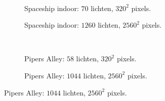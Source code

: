 \begin{figure}[t]
\begin{subfigure}[b]{\textwidth}
  \end{subfigure}\hfill\\
  \begin{adjustbox}{minipage=\textwidth, scale=0.55}
    \begin{subfigure}[b]{0.8\textwidth}
      \centering
      \def\svgwidth{\textwidth}
      
      \caption{Spaceship indoor: $70$ lichten, $320^2$ pixels.}
      \label{fig:ts-lc-frames-deferred:indoor-low}
    \end{subfigure}
  \end{adjustbox}\hspace{-0.075\textwidth}  %
  \begin{adjustbox}{minipage=\textwidth, scale=0.55}
    \begin{subfigure}[b]{0.8\textwidth}
      \centering
      \def\svgwidth{\textwidth}
      
      \caption{Spaceship indoor: $1260$ lichten, $2560^2$ pixels.}
      \label{fig:ts-lc-frames-deferred:indoor-high}
    \end{subfigure}
  \end{adjustbox} \\
  \begin{adjustbox}{minipage=\textwidth, scale=0.55}
    \begin{subfigure}[b]{0.8\textwidth}
      \centering
      \def\svgwidth{\textwidth}
      
      \caption{Pipers Alley: $58$ lichten, $320^2$ pixels.}
      \label{fig:ts-lc-frames-deferred:alley-low}
    \end{subfigure}
  \end{adjustbox}\hspace{-0.075\textwidth}  %
  \begin{adjustbox}{minipage=\textwidth, scale=0.55}
    \begin{subfigure}[b]{0.8\textwidth}
      \centering
      \def\svgwidth{\textwidth}
      
      \caption{Pipers Alley: $1044$ lichten, $2560^2$ pixels.}

\end{subfigure}
\end{adjustbox}
\end{figure}
